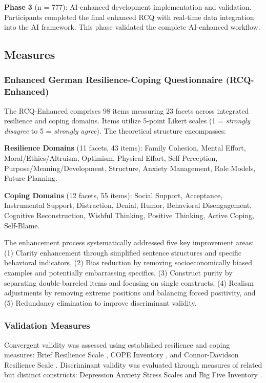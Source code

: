 \documentclass[12pt,a4paper]{article}
\begin{document}
\textbf{Phase 3} (n = 777): AI-enhanced development implementation and validation. Participants completed the final enhanced RCQ with real-time data integration into the AI framework. This phase validated the complete AI-enhanced workflow.

\subsection{Measures}

\subsubsection{Enhanced German Resilience-Coping Questionnaire (RCQ-Enhanced)}

The RCQ-Enhanced comprises 98 items measuring 23 facets across integrated resilience and coping domains. Items utilize 5-point Likert scales (1 = \textit{strongly disagree} to 5 = \textit{strongly agree}). The theoretical structure encompasses:

\textbf{Resilience Domains} (11 facets, 43 items): Family Cohesion, Mental Effort, Moral/Ethics/Altruism, Optimism, Physical Effort, Self-Perception, Purpose/Meaning/Development, Structure, Anxiety Management, Role Models, Future Planning.

\textbf{Coping Domains} (12 facets, 55 items): Social Support, Acceptance, Instrumental Support, Distraction, Denial, Humor, Behavioral Disengagement, Cognitive Reconstruction, Wishful Thinking, Positive Thinking, Active Coping, Self-Blame.

The enhancement process systematically addressed five key improvement areas: (1) Clarity enhancement through simplified sentence structures and specific behavioral indicators, (2) Bias reduction by removing socioeconomically biased examples and potentially embarrassing specifics, (3) Construct purity by separating double-barreled items and focusing on single constructs, (4) Realism adjustments by removing extreme positions and balancing forced positivity, and (5) Redundancy elimination to improve discriminant validity.

\subsubsection{Validation Measures}

Convergent validity was assessed using established resilience and coping measures: Brief Resilience Scale \cite{Smith2008}, COPE Inventory \cite{Carver1997}, and Connor-Davidson Resilience Scale \cite{Connor2003}. Discriminant validity was evaluated through measures of related but distinct constructs: Depression Anxiety Stress Scales \cite{Lovibond1995} and Big Five Inventory \cite{John2008}.
\end{document}
